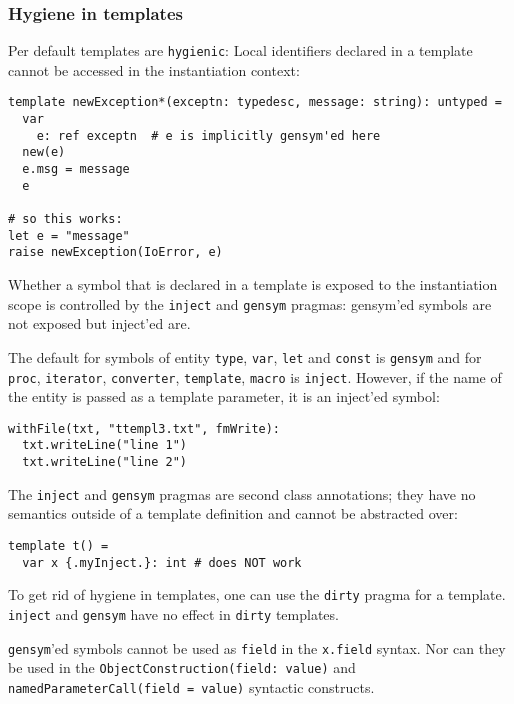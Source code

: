 \hypertarget{hygiene-in-templates}{%
\subsubsection{Hygiene in templates}\label{hygiene-in-templates}}

Per default templates are \texttt{hygienic}: Local identifiers declared
in a template cannot be accessed in the instantiation context:

\begin{verbatim}
template newException*(exceptn: typedesc, message: string): untyped =
  var
    e: ref exceptn  # e is implicitly gensym'ed here
  new(e)
  e.msg = message
  e

# so this works:
let e = "message"
raise newException(IoError, e)
\end{verbatim}

Whether a symbol that is declared in a template is exposed to the
instantiation scope is controlled by the \texttt{inject} and
\texttt{gensym} pragmas: gensym'ed symbols are not exposed but inject'ed
are.

The default for symbols of entity \texttt{type}, \texttt{var},
\texttt{let} and \texttt{const} is \texttt{gensym} and for
\texttt{proc}, \texttt{iterator}, \texttt{converter}, \texttt{template},
\texttt{macro} is \texttt{inject}. However, if the name of the entity is
passed as a template parameter, it is an inject'ed symbol:

\begin{verbatim}
withFile(txt, "ttempl3.txt", fmWrite):
  txt.writeLine("line 1")
  txt.writeLine("line 2")
\end{verbatim}

The \texttt{inject} and \texttt{gensym} pragmas are second class
annotations; they have no semantics outside of a template definition and
cannot be abstracted over:

\begin{verbatim}
template t() =
  var x {.myInject.}: int # does NOT work
\end{verbatim}

To get rid of hygiene in templates, one can use the \texttt{dirty}
pragma for a template. \texttt{inject} and \texttt{gensym} have no
effect in \texttt{dirty} templates.

\texttt{gensym}'ed symbols cannot be used as \texttt{field} in the
\texttt{x.field} syntax. Nor can they be used in the
\texttt{ObjectConstruction(field:\ value)} and
\texttt{namedParameterCall(field\ =\ value)} syntactic constructs.

